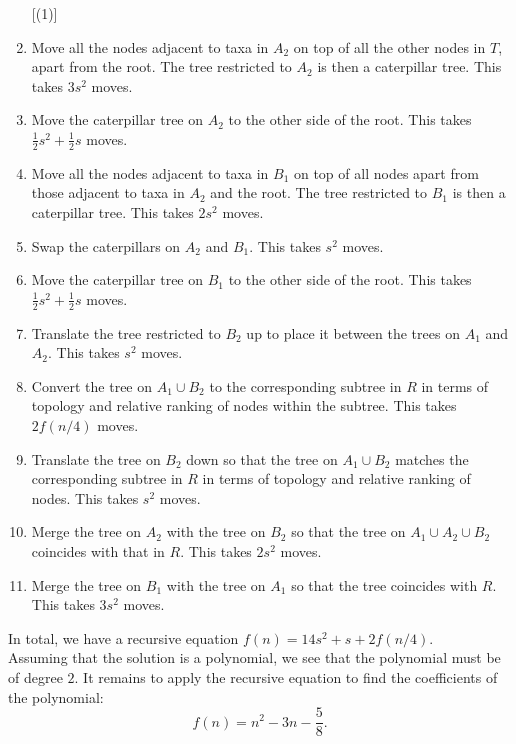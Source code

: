 \documentclass[11pt]{amsart}
\theoremstyle{definition}
\begin{document}
 \begin{enumerate} [(1)]
\item Move all the nodes adjacent to taxa in $A_2$ on top of all the other nodes in $T$, apart from the root.
The tree restricted to $A_2$ is then a caterpillar tree.
This takes $3s^2$ moves.

\item Move the caterpillar tree on $A_2$ to the other side of the root.
This takes $\frac12 s^2 + \frac12 s$ moves.

\item Move all the nodes adjacent to taxa in $B_1$ on top of all nodes apart from those adjacent to taxa in $A_2$ and the root.
The tree restricted to $B_1$ is then a caterpillar tree.
This takes $2s^2$ moves.

\item Swap the caterpillars on $A_2$ and $B_1$.
This takes $s^2$ moves.

\item Move the caterpillar tree on $B_1$ to the other side of the root.
This takes $\frac12 s^2 + \frac12 s$ moves.

\item Translate the tree restricted to $B_2$ up to place it between the trees on $A_1$ and $A_2$.
This takes $s^2$ moves.

\item Convert the tree on $A_1 \cup B_2$ to the corresponding subtree in $R$ in terms of topology and relative ranking of nodes within the subtree.
This takes $2f(n/4)$ moves.

\item Translate the tree on $B_2$ down so that the tree on $A_1 \cup B_2$ matches the corresponding subtree in $R$ in terms of topology and relative ranking of nodes.
This takes $s^2$ moves.

\item Merge the tree on $A_2$ with the tree on $B_2$ so that the tree on $A_1 \cup A_2 \cup B_2$ coincides with that in $R$.
This takes $2s^2$ moves.

\item Merge the tree on $B_1$ with the tree on $A_1$ so that the tree coincides with $R$.
This takes $3s^2$ moves.
 \end{enumerate} 

In total, we have a recursive equation $f(n) = 14s^2 + s + 2 f(n/4)$.\\
Assuming that the solution is a polynomial, we see that the polynomial must be of degree $2$.
It remains to apply the recursive equation to find the coefficients of the polynomial:
\[
f(n) = n^2 - 3n - \frac 58.
\]
\end{document}
